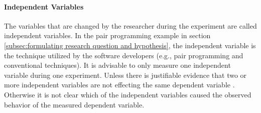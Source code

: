 
\paragraph{Independent Variables}

The variables that are changed by the researcher during the experiment are called independent variables. In the pair programming example in section \ref{subsec:formulating research question and hypothesis}, the independent variable is the technique utilized by the software developers (e.g., pair programming and conventional techniques). It is advisable to only measure one independent variable during one experiment. Unless there is justifiable evidence that two or more independent variables are not effecting the same dependent variable \cite{BuddiesVariables}. Otherwise it is not clear which of the independent variables caused the observed behavior of the measured dependent variable.